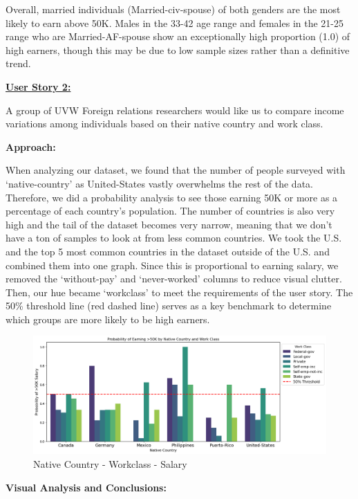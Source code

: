 \documentclass[journal,onecolumn]{IEEEtran}
\begin{document}
Overall, married individuals (Married-civ-spouse) of both genders are
the most likely to earn above 50K. Males in the 33-42 age range and
females in the 21-25 range who are Married-AF-spouse show an exceptionally
high proportion (1.0) of high earners, though this may be due to low sample sizes rather than a definitive trend.
\bigskip

\underline{\textbf{User Story 2:}}


A group of UVW Foreign relations researchers would like us to compare income variations among individuals based on their native country and work class.

\textbf{Approach:} 

When analyzing our dataset, we found that the number of people surveyed with `native-country' as United-States vastly overwhelms the rest of the data. 
Therefore, we did a probability analysis to see those earning 50K or more as a percentage of each country's population. The number of countries is also very high and
the tail of the dataset becomes very narrow, meaning that we don't have a ton of samples to look at from less common countries. 
We took the U.S. and the top 5 most common countries in the dataset outside of the U.S. and combined them into one graph. 
Since this is proportional to earning salary, we removed the `without-pay' and `never-worked' columns to reduce visual clutter.
Then, our hue became `workclass' to meet the requirements of the user story.
The 50\% threshold line (red dashed line) serves as a key benchmark to determine which groups are more likely to be high earners.

\begin{figure}[h]
    \centering
    \includegraphics[width=1\linewidth]{country-workclass.png}  %
    \caption{Native Country - Workclass - Salary}
    \label{fig:mf_marital_agebins}
\end{figure}

\textbf{Visual Analysis and Conclusions:} 
\end{document}
